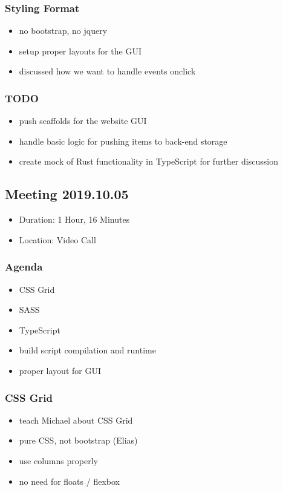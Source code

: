 \documentclass[11pt]{article}
\begin{document}
\subsubsection*{Styling Format}
\label{sec:org629d9a3}
\begin{itemize}
\item no bootstrap, no jquery
\item setup proper layouts for the GUI
\item discussed how we want to handle events onclick
\end{itemize}
\subsubsection*{{\bfseries\sffamily TODO} }
\label{sec:orgb7c4d97}
\begin{itemize}
\item push scaffolds for the website GUI
\item handle basic logic for pushing items to back-end storage
\item create mock of Rust functionality in TypeScript for further discussion
\end{itemize}
\subsection{Meeting 2019.10.05}
\label{sec:org7df7d27}
\begin{itemize}
\item Duration: 1 Hour, 16 Minutes
\item Location: Video Call
\end{itemize}
\subsubsection*{Agenda}
\label{sec:org02934fe}
\begin{itemize}
\item CSS Grid
\item SASS
\item TypeScript
\item build script compilation and runtime
\item proper layout for GUI
\end{itemize}
\subsubsection*{CSS Grid}
\label{sec:org57298d1}
\begin{itemize}
\item teach Michael about CSS Grid
\item pure CSS, not bootstrap (Elias)
\item use columns properly
\item no need for floats / flexbox
\end{itemize}
\end{document}
